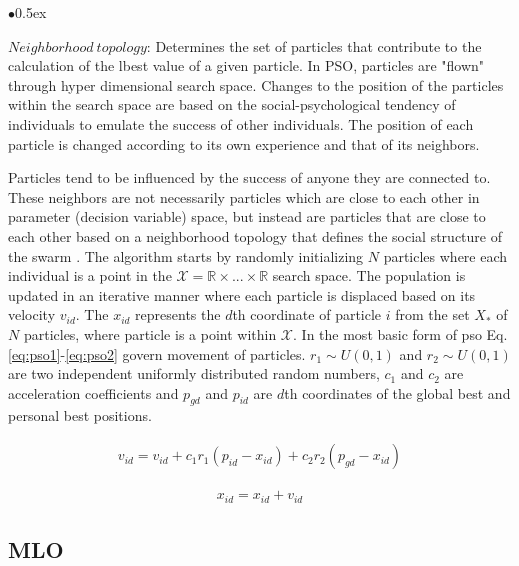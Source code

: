 \documentclass[11pt, runningheads,a4paper]{llncs}
\begin{document}
\begin{list}{$\bullet$}{\itemsep 0.5ex}
\item $Neighborhood\ topology$: Determines the set of particles that contribute to the calculation of the lbest value of a given particle. In PSO, particles are "flown" through hyper dimensional search space. Changes to the position of the particles within the search space are based on the social-psychological tendency of individuals to emulate the success of other individuals. The position of each particle is changed according to its own experience and that of its neighbors. 

\end{list}

Particles tend to be influenced by the success of anyone they are connected to. These neighbors are not necessarily particles which are close to each other in parameter (decision variable) space, but instead are particles that are close to each other based on a neighborhood topology that defines the social structure of the swarm \cite{swarm2001}. 
The algorithm starts by randomly initializing $N$ particles where each individual is a point in the $\mathcal{X} = \mathbb{R} \times ... \times \mathbb{R}$ search space. The population is updated in an iterative manner where each particle is displaced based on its velocity $v_{id}$. The $x_{id}$ represents the $d$th coordinate of particle $i$ from the set $X_*$ of $N$ particles, where particle is a point within $\mathcal{X}$. In the most basic form of \ac{pso} Eq. \ref{eq:pso1}-\ref{eq:pso2} govern movement of particles. $r_1 \sim U(0,1)$ and $r_2 \sim U(0,1)$ are two independent uniformly distributed random numbers, $c_1$ and $c_2$ are acceleration coefficients and $p_{gd}$ and $p_{id}$ are $d$th coordinates of the global best and personal best positions. 



\begin{align} 
\label{eq:pso1}
v_{id}=v_{id}+c_{1}r_{1}(p_{id}-x_{id}) + c_{2}r_{2}(p_{gd}-x_{id})
\end{align}



\begin{align} 
\label{eq:pso2}
x_{id}=x_{id}+v_{id} 
\end{align}



\subsection{MLO}
\end{document}
